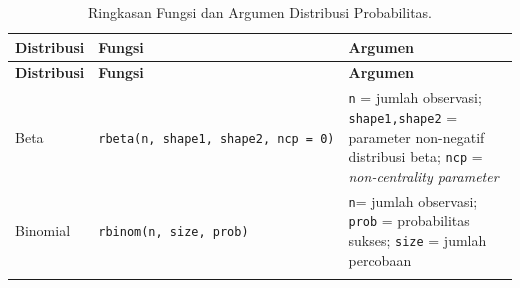 \documentclass[]{book}
\theoremstyle{definition}
\theoremstyle{definition}
\theoremstyle{definition}
\theoremstyle{remark}
\begin{document}
\begin{longtable}[]{@{}lll@{}}
\caption{\label{tab:randomsequence} Ringkasan Fungsi dan Argumen Distribusi Probabilitas.}\tabularnewline
\toprule
\begin{minipage}[b]{0.07\columnwidth}\raggedright
\textbf{Distribusi}\strut
\end{minipage} & \begin{minipage}[b]{0.19\columnwidth}\raggedright
\textbf{Fungsi}\strut
\end{minipage} & \begin{minipage}[b]{0.65\columnwidth}\raggedright
\textbf{Argumen}\strut
\end{minipage}\tabularnewline
\midrule
\endfirsthead
\toprule
\begin{minipage}[b]{0.07\columnwidth}\raggedright
\textbf{Distribusi}\strut
\end{minipage} & \begin{minipage}[b]{0.19\columnwidth}\raggedright
\textbf{Fungsi}\strut
\end{minipage} & \begin{minipage}[b]{0.65\columnwidth}\raggedright
\textbf{Argumen}\strut
\end{minipage}\tabularnewline
\midrule
\endhead
\begin{minipage}[t]{0.07\columnwidth}\raggedright
Beta\strut
\end{minipage} & \begin{minipage}[t]{0.19\columnwidth}\raggedright
\texttt{rbeta(n,\ shape1,\ shape2,\ ncp\ =\ 0)}\strut
\end{minipage} & \begin{minipage}[t]{0.65\columnwidth}\raggedright
\texttt{n} = jumlah observasi; \texttt{shape1,shape2} = parameter non-negatif distribusi beta; \texttt{ncp} = \emph{non-centrality parameter}\strut
\end{minipage}\tabularnewline
\begin{minipage}[t]{0.07\columnwidth}\raggedright
Binomial\strut
\end{minipage} & \begin{minipage}[t]{0.19\columnwidth}\raggedright
\texttt{rbinom(n,\ size,\ prob)}\strut
\end{minipage} & \begin{minipage}[t]{0.65\columnwidth}\raggedright
\texttt{n}= jumlah observasi; \texttt{prob} = probabilitas sukses; \texttt{size} = jumlah percobaan\strut
\end{minipage}\tabularnewline
\begin{minipage}[t]{0.07\columnwidth}\raggedright

\end{minipage}
\end{longtable}
\end{document}
